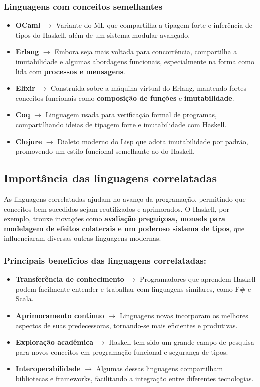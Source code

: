 \subsubsection{Linguagens com conceitos semelhantes}
\begin{itemize}
    \item \textbf{OCaml} $\rightarrow$ Variante do ML que compartilha a tipagem forte e inferência de tipos do Haskell, além de um sistema modular avançado.
    \item \textbf{Erlang} $\rightarrow$ Embora seja mais voltada para concorrência, compartilha a imutabilidade e algumas abordagens funcionais, especialmente na forma como lida com \textbf{processos e mensagens}.
    \item \textbf{Elixir} $\rightarrow$ Construída sobre a máquina virtual do Erlang, mantendo fortes conceitos funcionais como \textbf{composição de funções} e \textbf{imutabilidade}.
    \item \textbf{Coq} $\rightarrow$ Linguagem usada para verificação formal de programas, compartilhando ideias de tipagem forte e imutabilidade com Haskell.
    \item \textbf{Clojure} $\rightarrow$ Dialeto moderno do Lisp que adota imutabilidade por padrão, promovendo um estilo funcional semelhante ao do Haskell.
\end{itemize}

\subsection{Importância das linguagens correlatadas}

As linguagens correlatadas ajudam no avanço da programação, permitindo que conceitos bem-sucedidos sejam reutilizados e aprimorados. O Haskell, por exemplo, trouxe inovações como \textbf{avaliação preguiçosa, monads para modelagem de efeitos colaterais e um poderoso sistema de tipos}, que influenciaram diversas outras linguagens modernas.

\subsubsection{Principais benefícios das linguagens correlatadas:}
\begin{itemize}
    \item \textbf{Transferência de conhecimento} $\rightarrow$ Programadores que aprendem Haskell podem facilmente entender e trabalhar com linguagens similares, como F# e Scala.
    \item \textbf{Aprimoramento contínuo} $\rightarrow$ Linguagens novas incorporam os melhores aspectos de suas predecessoras, tornando-se mais eficientes e produtivas.
    \item \textbf{Exploração acadêmica} $\rightarrow$ Haskell tem sido um grande campo de pesquisa para novos conceitos em programação funcional e segurança de tipos.
    \item \textbf{Interoperabilidade} $\rightarrow$ Algumas dessas linguagens compartilham bibliotecas e frameworks, facilitando a integração entre diferentes tecnologias.
\end{itemize}


